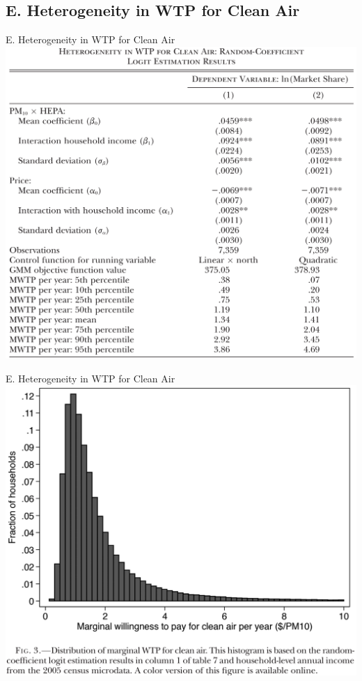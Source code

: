 \documentclass{beamer}
\begin{document}
\subsection{E. Heterogeneity in WTP for Clean Air}
\begin{frame}[shrink]
	\transfade %
	\tableofcontents[sectionstyle=show/shaded,subsectionstyle=show/shaded/hide]
	\addtocounter{framenumber}{-1}
\end{frame}
\begin{frame}{E. Heterogeneity in WTP for Clean Air}
	\centering
	\includegraphics[scale=0.35]{table7.png}	
\end{frame}
\begin{frame}{E. Heterogeneity in WTP for Clean Air}
	\centering
	\includegraphics[scale=0.37]{figure3.png}	
\end{frame}
\end{document}
